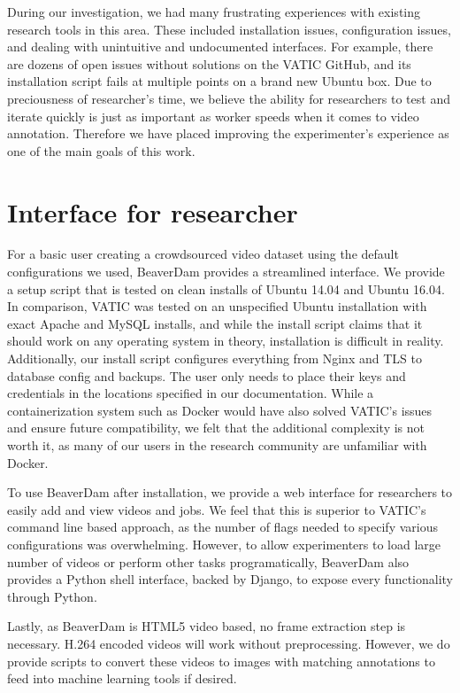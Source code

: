 
During our investigation, we had many frustrating experiences with existing research tools in this area.
These included installation issues, configuration issues, and dealing with unintuitive and undocumented interfaces.
For example, there are dozens of open issues without solutions on the VATIC GitHub, 
and its installation script fails at multiple points on a brand new Ubuntu box. 
Due to preciousness of researcher's time,
we believe the ability for researchers to test and iterate quickly is just as important as worker speeds when it comes to video annotation.
Therefore we have placed improving the experimenter's experience as one of the main goals of this work.

\section{Interface for researcher}

For a basic user creating a crowdsourced video dataset using the default configurations we used, 
BeaverDam provides a streamlined interface.
We provide a setup script that is tested on clean installs of Ubuntu 14.04 and Ubuntu 16.04.
In comparison, VATIC was tested on an unspecified Ubuntu installation with exact Apache and MySQL installs,
and while the install script claims that it should work on any operating system in theory, 
installation is difficult in reality. 
Additionally, our install script configures everything from Nginx and TLS to database config and backups.
The user only needs to place their keys and credentials in the locations specified in our documentation.
While a containerization system such as Docker would have also solved VATIC's issues and ensure future compatibility,
we felt that the additional complexity is not worth it, as many of our users in the research community are unfamiliar with Docker. 

To use BeaverDam after installation, we provide a web interface for researchers to easily add and view videos and jobs.
We feel that this is superior to VATIC's command line based approach, 
as the number of flags needed to specify various configurations was overwhelming. 
However, to allow experimenters to load large number of videos or perform other tasks programatically, 
BeaverDam also provides a Python shell interface, backed by Django, to expose every functionality through Python.

Lastly, as BeaverDam is HTML5 video based, no frame extraction step is necessary.
H.264 encoded videos will work without preprocessing.
However, we do provide scripts to convert these videos to images with matching annotations to feed into machine learning tools if desired.

